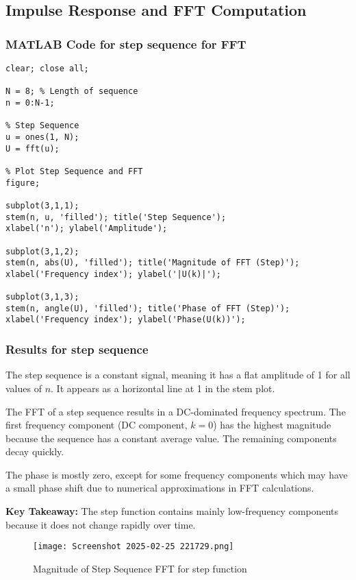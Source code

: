 \documentclass[a4paper,12pt]{article}
\begin{document}
\subsection{Impulse Response and FFT Computation}

\subsubsection{MATLAB Code for step sequence for FFT}
\begin{verbatim}
clear; close all;

N = 8; % Length of sequence
n = 0:N-1;

% Step Sequence
u = ones(1, N);
U = fft(u);

% Plot Step Sequence and FFT
figure;

subplot(3,1,1);
stem(n, u, 'filled'); title('Step Sequence');
xlabel('n'); ylabel('Amplitude');

subplot(3,1,2);
stem(n, abs(U), 'filled'); title('Magnitude of FFT (Step)');
xlabel('Frequency index'); ylabel('|U(k)|');

subplot(3,1,3);
stem(n, angle(U), 'filled'); title('Phase of FFT (Step)');
xlabel('Frequency index'); ylabel('Phase(U(k))');

\end{verbatim}

\subsubsection{Results for step sequence}
The step sequence is a constant signal, meaning it has a flat amplitude of 1 for all values of \( n \). It appears as a horizontal line at 1 in the stem plot.

The FFT of a step sequence results in a DC-dominated frequency spectrum. The first frequency component (DC component, \( k=0 \)) has the highest magnitude because the sequence has a constant average value. The remaining components decay quickly.

The phase is mostly zero, except for some frequency components which may have a small phase shift due to numerical approximations in FFT calculations.

\textbf{Key Takeaway:} The step function contains mainly low-frequency components because it does not change rapidly over time.
\begin{figure}[h]
    \centering
    \texttt{[image: Screenshot 2025-02-25 221729.png]}
    \caption{Magnitude of Step Sequence FFT for step function}
    \label{fig:impulse_fft_result}
\end{figure}
\end{document}

